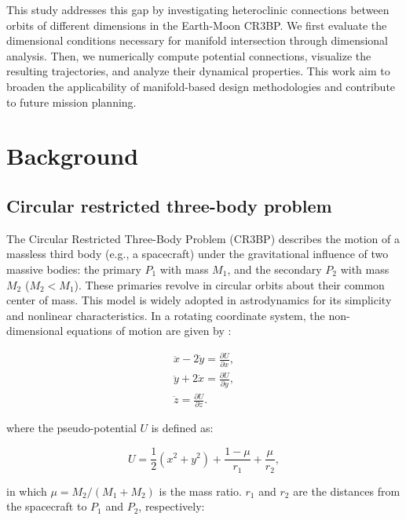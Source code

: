 \documentclass[JESA]{tjsass} %
\begin{document}
This study addresses this gap by investigating heteroclinic connections between orbits of different dimensions in the Earth-Moon CR3BP. We first evaluate the dimensional conditions necessary for manifold intersection through dimensional analysis. Then, we numerically compute potential connections, visualize the resulting trajectories, and analyze their dynamical properties. This work aim to broaden the applicability of manifold-based design methodologies and contribute to future mission planning. 

\section{Background}

\subsection{Circular restricted three-body problem}

The Circular Restricted Three-Body Problem (CR3BP) describes the motion of a massless third body (e.g., a spacecraft) under the gravitational influence of two massive bodies: the primary $P_1$ with mass $M_1$, and the secondary $P_2$ with mass $M_2$ ($M_2 < M_1$). These primaries revolve in circular orbits about their common center of mass. This model is widely adopted in astrodynamics for its simplicity and nonlinear characteristics. In a rotating coordinate system, the non-dimensional equations of motion are given by \cite{szebehely1967}:

\begin{equation}
    \begin{aligned}
        \ddot{x} - 2\dot{y} = \frac{\partial U}{\partial x},\\
        \ddot{y} + 2\dot{x} = \frac{\partial U}{\partial y},\\
        \ddot{z} = \frac{\partial U}{\partial z}.
    \end{aligned}
\end{equation}

where the pseudo-potential $U$ is defined as:

\begin{equation}
    U = \frac{1}{2}(x^2 + y^2) + \frac{1 - \mu}{r_1} + \frac{\mu}{r_2},
\end{equation}

in which $\mu = M_2/(M_1 + M_2)$ is the mass ratio. $r_1$ and $r_2$ are the distances from the spacecraft to $P_1$ and $P_2$, respectively:
\end{document}
